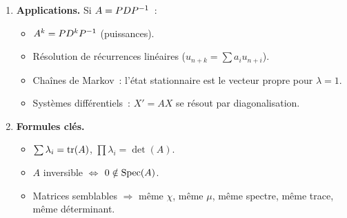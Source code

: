 \begin{framed}
\begin{enumerate}[label=\textbf{\arabic*.},leftmargin=2em]
  \item \textbf{Applications.} Si $A=PD{P}^{-1}$~:
    \begin{itemize}
      \item $A^k=PD^k{P}^{-1}$ (puissances).
      \item Résolution de récurrences linéaires ($u_{n+k}=\sum a_i u_{n+i}$).
      \item Chaînes de Markov~: l'état stationnaire est le vecteur
        propre pour $\lambda=1$.
      \item Systèmes différentiels~: $X'=AX$ se résout par
        diagonalisation.
    \end{itemize}

  \item \textbf{Formules clés.}
    \begin{itemize}
      \item $\sum\lambda_i=\operatorname{tr}(A)$, \;$\prod\lambda_i=\det(A)$.
      \item $A$ inversible $\Leftrightarrow$ $0\notin\operatorname{Spec}(A)$.
      \item Matrices semblables $\Rightarrow$ même $\chi$, même $\mu$,
        même spectre, même trace, même déterminant.
    \end{itemize}
\end{enumerate}
\end{framed}